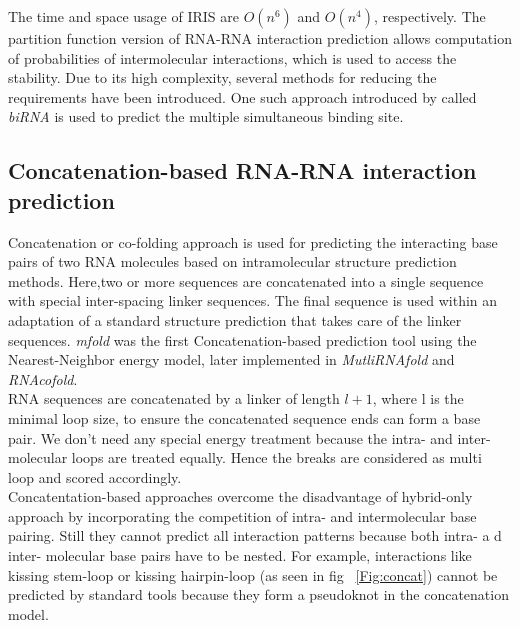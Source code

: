 \documentclass[twoside,a4paper]{report}
\numberwithin{equation}{section}
\begin{document}
	The time and space usage of IRIS are $ O(n^6)$ and $ O(n^4)$, respectively. The partition function version of RNA-RNA interaction prediction allows computation of probabilities of intermolecular interactions, which is used to access the stability. Due to its high complexity, several methods for reducing the requirements have been introduced. One such approach introduced by \citet{ chitsaz2009birna} called \textit{biRNA} is used to predict the multiple simultaneous binding site. \\
	
	 
	\subsection{Concatenation-based RNA-RNA interaction prediction}
	Concatenation or co-folding approach is used for predicting the interacting base pairs of two RNA molecules based on intramolecular structure prediction methods. Here,two or more sequences are concatenated  into a single sequence with special inter-spacing linker sequences. The final sequence is used within an adaptation of a standard structure prediction that takes  care of the linker sequences. \textit{mfold} was the first Concatenation-based prediction tool using the Nearest-Neighbor energy model, later implemented in \textit{MutliRNAfold} and \textit{RNAcofold}.\\

	
	 RNA sequences are concatenated by a linker of length $l+1$, where l is the minimal loop size, to ensure the concatenated sequence ends can form a base pair. We don't need any special energy treatment because the intra- and inter- molecular loops are treated equally. Hence the breaks are considered as multi loop and scored accordingly. \\
		
	Concatentation-based approaches overcome the disadvantage of hybrid-only approach by incorporating the competition of intra- and intermolecular base pairing. Still they cannot predict all interaction patterns because both intra- a d inter- molecular base pairs have to be nested. For example, interactions like kissing stem-loop or kissing hairpin-loop (as seen in fig ~\ref{Fig:concat}) cannot be predicted by standard tools because they form a pseudoknot in the concatenation model. \\
	
\end{document}
